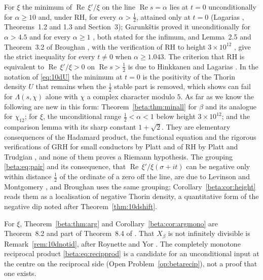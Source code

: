 For $\xi$ the minimum of $\operatorname{Re}\,\xi'/\xi$ on the line $\operatorname{Re}s=\alpha$ lies at $t=0$ unconditionally for $\alpha\ge10$ and, under RH, for every $\alpha>\tfrac12$, attained only at $t=0$ (Lagarias \cite{lagarias1999}, Theorems~1.2 and 1.3 and Section~3); Garunk\v{s}tis proved it unconditionally for $\alpha>4.5$ \cite{garunkstis2000} and for every $\alpha\ge1$ \cite{garunkstis2002}, both stated for the infimum, and Lemma~2.5 and Theorem~3.2 of Broughan \cite{broughan2009}, with the verification of RH to height $3\times10^{12}$ \cite{platttrudgian2021}, give the strict inequality for every $t\ne0$ when $\alpha\ge1.043$. The criterion that RH is equivalent to $\operatorname{Re}\,\xi'/\xi>0$ on $\operatorname{Re}s>\tfrac12$ is due to Hinkkanen \cite{hinkkanen1997} and Lagarias \cite{lagarias1999}. In the notation of \eqref{eq:10dU} the minimum at $t=0$ is the positivity of the Thorin density $U$ that remains when the $\tfrac12$ stable part is removed, which \cite[Remark~31]{polson2018vdp} shows can fail for $\Lambda(s,\chi)$ alone with $\chi$ a complex character modulo $5$. As far as we know the following are new in this form: Theorem~\ref{beta:thm:minall} for $\beta$ and its analogue for $\chi_{12}$; for $\xi$, the unconditional range $\tfrac12<\alpha<1$ below height $3\times10^{12}$; and the comparison lemma with its sharp constant $1+\sqrt2$. They are elementary consequences of the Hadamard product, the functional equation and the rigorous verifications of GRH for small conductors by Platt \cite{platt2016} and of RH by Platt and Trudgian \cite{platttrudgian2021}, and none of them proves a Riemann hypothesis. The grouping \eqref{beta:eq:pair} and its consequence, that $\operatorname{Re}\,\xi'/\xi(\sigma+it)$ can be negative only within distance $\tfrac12$ of the ordinate of a zero off the line, are due to Levinson and Montgomery \cite[Section~2]{levinsonmontgomery1974}, and Broughan \cite{broughan2009} uses the same grouping; Corollary~\ref{beta:cor:height} reads them as a localisation of negative Thorin density, a quantitative form of the negative dip noted after Theorem~\ref{thm:10dshift}.

For $\xi$, Theorem~\ref{beta:thm:arg} and Corollary~\ref{beta:cor:argmono} are Theorem~8.2 and part of Theorem~8.4 of \cite{polson2017}. That $X_\beta$ is not infinitely divisible is Remark~\ref{rem:10dnotid}, after Roynette and Yor \cite{roynetteyor2005}. The completely monotone reciprocal product \eqref{beta:eq:recipprod} is a candidate for an unconditional input at the centre on the reciprocal side (Open Problem~\ref{op:betarecip}), not a proof that one exists.

